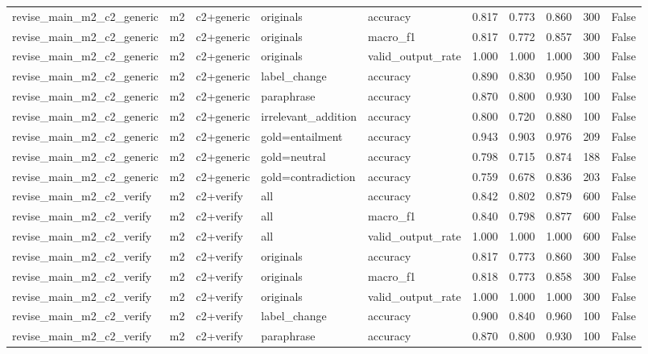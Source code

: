 \begin{tabular}{llllllllll}
revise\_main\_m2\_c2\_generic & m2 & c2+generic & originals & accuracy & 0.817 & 0.773 & 0.860 & 300 & False \\
revise\_main\_m2\_c2\_generic & m2 & c2+generic & originals & macro\_f1 & 0.817 & 0.772 & 0.857 & 300 & False \\
revise\_main\_m2\_c2\_generic & m2 & c2+generic & originals & valid\_output\_rate & 1.000 & 1.000 & 1.000 & 300 & False \\
revise\_main\_m2\_c2\_generic & m2 & c2+generic & label\_change & accuracy & 0.890 & 0.830 & 0.950 & 100 & False \\
revise\_main\_m2\_c2\_generic & m2 & c2+generic & paraphrase & accuracy & 0.870 & 0.800 & 0.930 & 100 & False \\
revise\_main\_m2\_c2\_generic & m2 & c2+generic & irrelevant\_addition & accuracy & 0.800 & 0.720 & 0.880 & 100 & False \\
revise\_main\_m2\_c2\_generic & m2 & c2+generic & gold=entailment & accuracy & 0.943 & 0.903 & 0.976 & 209 & False \\
revise\_main\_m2\_c2\_generic & m2 & c2+generic & gold=neutral & accuracy & 0.798 & 0.715 & 0.874 & 188 & False \\
revise\_main\_m2\_c2\_generic & m2 & c2+generic & gold=contradiction & accuracy & 0.759 & 0.678 & 0.836 & 203 & False \\
revise\_main\_m2\_c2\_verify & m2 & c2+verify & all & accuracy & 0.842 & 0.802 & 0.879 & 600 & False \\
revise\_main\_m2\_c2\_verify & m2 & c2+verify & all & macro\_f1 & 0.840 & 0.798 & 0.877 & 600 & False \\
revise\_main\_m2\_c2\_verify & m2 & c2+verify & all & valid\_output\_rate & 1.000 & 1.000 & 1.000 & 600 & False \\
revise\_main\_m2\_c2\_verify & m2 & c2+verify & originals & accuracy & 0.817 & 0.773 & 0.860 & 300 & False \\
revise\_main\_m2\_c2\_verify & m2 & c2+verify & originals & macro\_f1 & 0.818 & 0.773 & 0.858 & 300 & False \\
revise\_main\_m2\_c2\_verify & m2 & c2+verify & originals & valid\_output\_rate & 1.000 & 1.000 & 1.000 & 300 & False \\
revise\_main\_m2\_c2\_verify & m2 & c2+verify & label\_change & accuracy & 0.900 & 0.840 & 0.960 & 100 & False \\
revise\_main\_m2\_c2\_verify & m2 & c2+verify & paraphrase & accuracy & 0.870 & 0.800 & 0.930 & 100 & False \\

\end{tabular}
